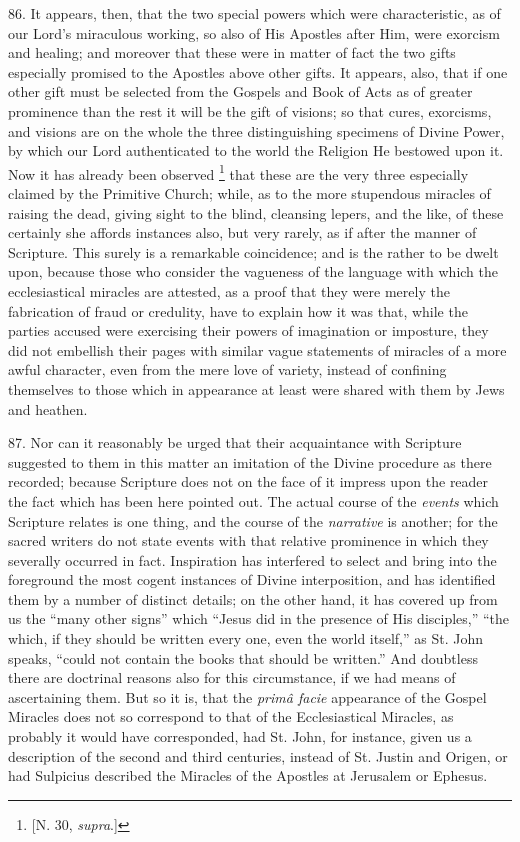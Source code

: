 86.
It appears, then, that the two special powers which were
characteristic, as of our Lord's miraculous working, so also of His
Apostles after Him, were exorcism and healing; and moreover that these
were in matter of fact the two gifts especially promised to the
Apostles above other gifts. It appears, also, that if one other gift
must be selected from the Gospels and Book of Acts as of greater
prominence than the rest it will be the gift of visions; so that
cures, exorcisms, and visions are on the whole the three
distinguishing specimens of Divine Power, by which our Lord
authenticated to the world the Religion He bestowed upon it. Now it
has already been observed \footnote{[N. 30, \emph{supra}.]}
that these are the very three especially claimed by the Primitive
Church; while, as to the more stupendous miracles of raising the dead,
giving sight to the blind, cleansing lepers, and the like, of these
certainly she affords instances also, but very rarely, as if after the
manner of Scripture. This surely is a remarkable coincidence;
and is the rather to be dwelt upon, because those who consider the
vagueness of the language with which the ecclesiastical miracles are
attested, as a proof that they were merely the fabrication of fraud or
credulity, have to explain how it was that, while the parties accused
were exercising their powers of imagination or imposture, they did not
embellish their pages with similar vague statements of miracles of a
more awful character, even from the mere love of variety, instead of
confining themselves to those which in appearance at least were shared
with them by Jews and heathen.

87.
Nor can it reasonably be urged that their acquaintance with Scripture
suggested to them in this matter an imitation of the Divine procedure
as there recorded; because Scripture does not on the face of it
impress upon the reader the fact which has been here pointed out. The
actual course of the \emph{events} which Scripture relates is one thing, and
the course of the \emph{narrative} is another; for the sacred writers do not
state events with that relative prominence in which they severally
occurred in fact. Inspiration has interfered to select and bring into
the foreground the most cogent instances of Divine interposition, and
has identified them by a number of distinct details; on the other
hand, it has covered up from us the ``many other signs'' which ``Jesus
did in the presence of His disciples,'' ``the which, if they should be
written every one, even the world itself,'' as St. John speaks, ``could
not contain the books that should be written.'' And doubtless there are
doctrinal reasons also for this circumstance, if we had means of
ascertaining them. But so it is, that the \emph{primâ facie}
appearance of the Gospel Miracles does not so correspond to that of
the Ecclesiastical Miracles, as probably it would have corresponded,
had St. John, for instance, given us a description of the second and
third centuries, instead of St. Justin and Origen, or had Sulpicius
described the Miracles of the Apostles at Jerusalem or Ephesus.

